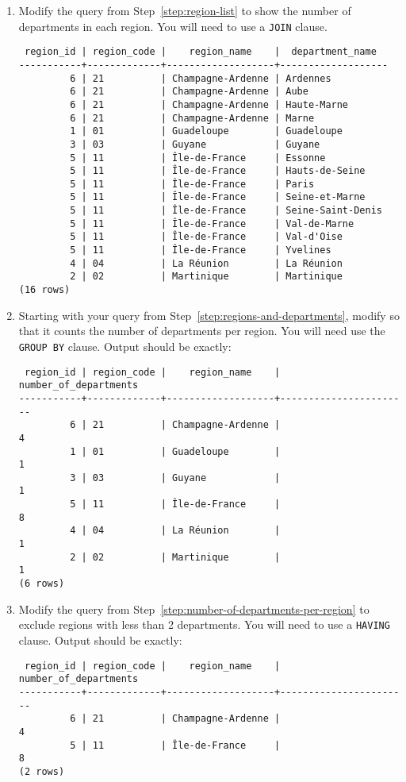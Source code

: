 \begin{enumerate}
\item Modify the query from Step~\ref{step:region-list} to show the number of departments in each region.
  You will need to use a \texttt{JOIN} clause.
\begin{verbatim}
 region_id | region_code |    region_name    |  department_name
-----------+-------------+-------------------+-------------------
         6 | 21          | Champagne-Ardenne | Ardennes
         6 | 21          | Champagne-Ardenne | Aube
         6 | 21          | Champagne-Ardenne | Haute-Marne
         6 | 21          | Champagne-Ardenne | Marne
         1 | 01          | Guadeloupe        | Guadeloupe
         3 | 03          | Guyane            | Guyane
         5 | 11          | Île-de-France     | Essonne
         5 | 11          | Île-de-France     | Hauts-de-Seine
         5 | 11          | Île-de-France     | Paris
         5 | 11          | Île-de-France     | Seine-et-Marne
         5 | 11          | Île-de-France     | Seine-Saint-Denis
         5 | 11          | Île-de-France     | Val-de-Marne
         5 | 11          | Île-de-France     | Val-d'Oise
         5 | 11          | Île-de-France     | Yvelines
         4 | 04          | La Réunion        | La Réunion
         2 | 02          | Martinique        | Martinique
(16 rows)
\end{verbatim}
\label{step:regions-and-departments}
  
\item
  Starting with your query from Step~\ref{step:regions-and-departments}, modify so that it counts the number of departments per region.
  You will need use the \texttt{GROUP BY} clause.
  Output should be exactly:
\begin{verbatim}
 region_id | region_code |    region_name    | number_of_departments
-----------+-------------+-------------------+-----------------------
         6 | 21          | Champagne-Ardenne |                     4
         1 | 01          | Guadeloupe        |                     1
         3 | 03          | Guyane            |                     1
         5 | 11          | Île-de-France     |                     8
         4 | 04          | La Réunion        |                     1
         2 | 02          | Martinique        |                     1
(6 rows)
\end{verbatim}
\label{step:number-of-departments-per-region}

\item
  Modify the query from Step~\ref{step:number-of-departments-per-region} to exclude regions with less than 2 departments.
  You will need to use a \texttt{HAVING} clause.
  Output should be exactly:
\begin{verbatim}
 region_id | region_code |    region_name    | number_of_departments
-----------+-------------+-------------------+-----------------------
         6 | 21          | Champagne-Ardenne |                     4
         5 | 11          | Île-de-France     |                     8
(2 rows)
\end{verbatim}
\label{step:number-of-departments-per-region-not-1}


\end{enumerate}
